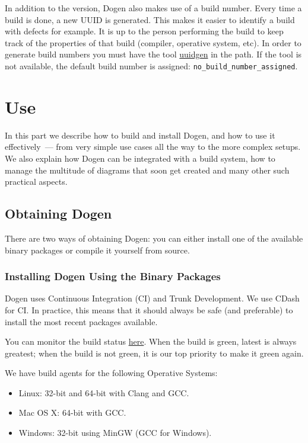 \documentclass{book}
\begin{document}
In addition to the version, Dogen also makes use of a build
number. Every time a build is done, a new UUID is generated. This
makes it easier to identify a build with defects for example. It is up
to the person performing the build to keep track of the properties of
that build (compiler, operative system, etc). In order to generate
build numbers you must have the tool
\href{http://www.linuxcommand.org/man_pages/uuidgen1.html}{uuidgen} in
the path. If the tool is not available, the default build number is
assigned: \texttt{no\_build\_number\_assigned}.

\part{Use}

In this part we describe how to build and install Dogen, and how to
use it effectively~--- from very simple use cases all the way to the
more complex setups. We also explain how Dogen can be integrated with
a build system, how to manage the multitude of diagrams that soon get
created and many other such practical aspects.

\chapter{Obtaining Dogen}

There are two ways of obtaining Dogen: you can either install one of
the available binary packages or compile it yourself from source.

\section{Installing Dogen Using the Binary Packages}

Dogen uses Continuous Integration (CI) and Trunk Development. We use
CDash for CI. In practice, this means that it should always be safe
(and preferable) to install the most recent packages available.

You can monitor the build status
\href{http://my.cdash.org/index.php?project\%3DDogen}{here}. When the
build is green, latest is always greatest; when the build is not
green, it is our top priority to make it green again.

We have build agents for the following Operative Systems:

\begin{itemize}
\item Linux: 32-bit and 64-bit with Clang and GCC.
\item Mac OS X: 64-bit with GCC.
\item Windows: 32-bit using MinGW (GCC for Windows).
\end{itemize}
\end{document}
